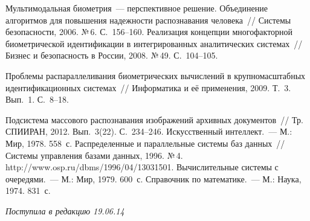 \begin{multicols}{2}
{{\begin{thebibliography}{99}
 Мультимодальная
биометрия~--- перспективное решение. Объединение алгоритмов для
\mbox{повышения} надежности распознавания человека~// Сис\-те\-мы безопасности,
2006. №\,6. С.~156--160.
 Реализация концепции многофакторной
биометрической идентификации в интегрированных аналитических
сис\-те\-мах~// Бизнес и безопасность в России, 2008. №\,49. С.~104--105.

 Проблемы распараллеливания био\-мет\-ри\-ческих вычислений
в крупномасштабных идентификационных сис\-те\-мах~// Информатика и её
применения, 2009. Т.~3. Вып.~1. С.~8--18.

 Подсистема массового распознавания изображений
архивных документов~// Тр. \mbox{СПИИРАН}, 2012. Вып.~3(22). С.~234--246.
 Искусственный интеллект.~--- М.: Мир, 1978. 558~с.
 Распределенные и параллельные системы баз
данных~// Сис\-те\-мы управ\-ле\-ния базами данных, 1996. №\,4. {\sf
http://www.osp.ru/dbms/1996/04/13031501}.
 Вычислительные системы с очередями.~--- М.: Мир, 1979.
600~с.
 Справочник по математике.~--- М.: Наука, 1974. 831~с.
 \end{thebibliography}

 }
 }

\end{multicols}

\vspace*{-12pt}

\hfill{\small\textit{Поступила в редакцию 19.06.14}}

\newpage






\def\tit{MODELS FOR COMPARATIVE ANALYSIS OF~CLASSIFICATION METHODS IN~DISTRIBUTED OBJECT RECOGNITION SYSTEMS}

\def\titkol{Models for comparative analysis of classification methods in distributed object recognition systems}

